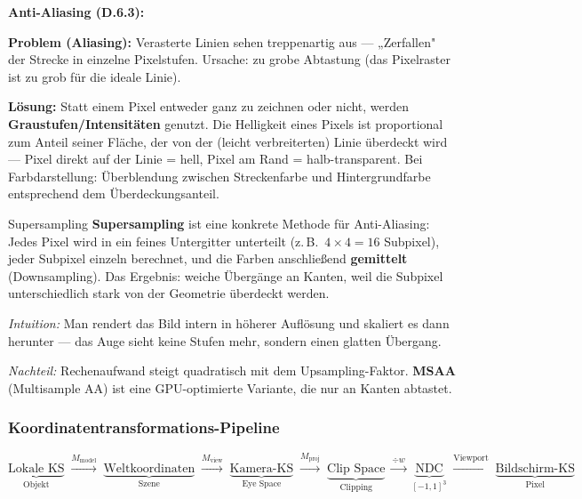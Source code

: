 \documentclass[12pt, a4paper]{article}
\begin{document}
\medskip
\textbf{Anti-Aliasing (D.6.3):}

\textbf{Problem (Aliasing):} Verasterte Linien sehen treppenartig aus — „Zerfallen" der Strecke in einzelne Pixelstufen. Ursache: zu grobe Abtastung (das Pixelraster ist zu grob für die ideale Linie).

\textbf{Lösung:} Statt einem Pixel entweder ganz zu zeichnen oder nicht, werden \textbf{Graustufen/Intensitäten} genutzt. Die Helligkeit eines Pixels ist proportional zum Anteil seiner Fläche, der von der (leicht verbreiterten) Linie überdeckt wird — Pixel direkt auf der Linie = hell, Pixel am Rand = halb-transparent. Bei Farbdarstellung: Überblendung zwischen Streckenfarbe und Hintergrundfarbe entsprechend dem Überdeckungsanteil.

\begin{notebox}{Supersampling}
\textbf{Supersampling} ist eine konkrete Methode für Anti-Aliasing: Jedes Pixel wird in ein feines Untergitter unterteilt (z.\,B.\ $4\times4 = 16$ Subpixel), jeder Subpixel einzeln berechnet, und die Farben anschließend \textbf{gemittelt} (Downsampling). Das Ergebnis: weiche Übergänge an Kanten, weil die Subpixel unterschiedlich stark von der Geometrie überdeckt werden.

\textit{Intuition:} Man rendert das Bild intern in höherer Auflösung und skaliert es dann herunter — das Auge sieht keine Stufen mehr, sondern einen glatten Übergang.

\textit{Nachteil:} Rechenaufwand steigt quadratisch mit dem Upsampling-Faktor. \textbf{MSAA} (Multisample AA) ist eine GPU-optimierte Variante, die nur an Kanten abtastet.
\end{notebox}

\subsubsection*{Koordinatentransformations-Pipeline}

\[
  \underbrace{\text{Lokale KS}}_{\text{Objekt}}
  \;\xrightarrow{M_{\text{model}}}\;
  \underbrace{\text{Weltkoordinaten}}_{\text{Szene}}
  \;\xrightarrow{M_{\text{view}}}\;
  \underbrace{\text{Kamera-KS}}_{\text{Eye Space}}
  \;\xrightarrow{M_{\text{proj}}}\;
  \underbrace{\text{Clip Space}}_{\text{Clipping}}
  \;\xrightarrow{\div w}\;
  \underbrace{\text{NDC}}_{[-1,1]^3}
  \;\xrightarrow{\text{Viewport}}\;
  \underbrace{\text{Bildschirm-KS}}_{\text{Pixel}}
\]
\end{document}
